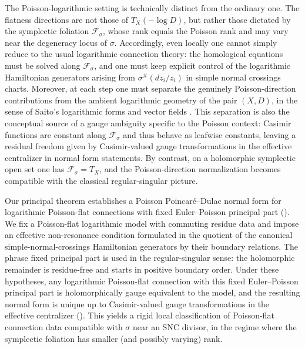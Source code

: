 \documentclass[11pt]{amsart}
\theoremstyle{plain}
\theoremstyle{definition}
\newcommand{\fol}{\mathcal{F}}
\theoremstyle{definition}
\begin{document}
The Poisson-logarithmic setting is technically distinct from the ordinary one. The flatness
directions are not those of $T_X(-\log D)$, but rather those dictated by the symplectic foliation
$\fol_\sigma$, whose rank equals the Poisson rank and may vary near the degeneracy locus of $\sigma$.
Accordingly, even locally one cannot simply reduce to the usual logarithmic connection theory: the
homological equations must be solved along $\fol_\sigma$, and one must keep explicit control of the
logarithmic Hamiltonian generators arising from $\sigma^\#(dz_i/z_i)$ in simple normal crossings
charts. Moreover, at each step one must separate the genuinely Poisson-direction contributions from
the ambient logarithmic geometry of the pair $(X,D)$, in the sense of Saito's logarithmic forms and
vector fields \cite{Saito80}. This separation is also the conceptual source of a gauge ambiguity
specific to the Poisson context: Casimir functions are constant along $\fol_\sigma$ and thus behave
as leafwise constants, leaving a residual freedom given by Casimir-valued gauge transformations in the effective centralizer
in normal form statements. By contrast, on a holomorphic symplectic open set one has
$\fol_\sigma=T_X$, and the Poisson-direction normalization becomes compatible with the classical
regular-singular picture.

Our principal theorem establishes a Poisson Poincar\'e--Dulac normal form for logarithmic
Poisson-flat connections with fixed Euler--Poisson principal part (). We fix a Poisson-flat logarithmic model with commuting residue data and impose an effective non-resonance condition formulated in the quotient of the canonical simple-normal-crossings Hamiltonian generators by their boundary relations. The phrase fixed principal part is used in the regular-singular sense: the holomorphic remainder is residue-free and starts in positive boundary order. Under these hypotheses, any logarithmic Poisson-flat connection with this fixed Euler--Poisson principal part is holomorphically gauge equivalent to the model, and the resulting normal form is unique up to Casimir-valued gauge transformations in the effective centralizer (). This
yields a rigid local classification of Poisson-flat connection data compatible with $\sigma$ near
an SNC divisor, in the regime where the symplectic foliation has smaller (and possibly varying)
rank.
\end{document}
